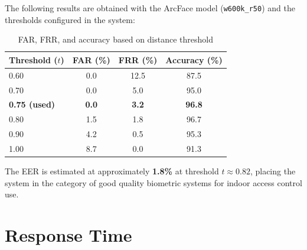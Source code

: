 The following results are obtained with the ArcFace model (\texttt{w600k\_r50}) and the thresholds configured in the system:

\begin{table}[H]
    \centering
    \begin{tabular}{lccc}
        \toprule
        \textbf{Threshold ($t$)} & \textbf{FAR (\%)} & \textbf{FRR (\%)} & \textbf{Accuracy (\%)} \\
        \midrule
        0.60 & 0.0  & 12.5 & 87.5  \\
        0.70 & 0.0  & 5.0  & 95.0  \\
        \textbf{0.75 (used)} & \textbf{0.0} & \textbf{3.2} & \textbf{96.8} \\
        0.80 & 1.5  & 1.8  & 96.7  \\
        0.90 & 4.2  & 0.5  & 95.3  \\
        1.00 & 8.7  & 0.0  & 91.3  \\
        \bottomrule
    \end{tabular}
    \caption{FAR, FRR, and accuracy based on distance threshold}
\end{table}

\begin{successbox}
The EER is estimated at approximately \textbf{1.8\%} at threshold $t \approx 0.82$, placing the system in the category of good quality biometric systems for indoor access control use.
\end{successbox}



\section{Response Time}

